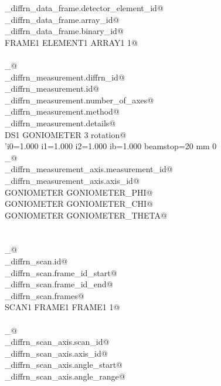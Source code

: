 \documentclass[10pt,a4paper,twoside,notitlepage]{article}
\begin{document}
\begin{flushleft}
\begin{minipage}{\linewidth}
\begin{list}{}{}
\mbox{}\verb@_diffrn_data_frame.detector_element_id@\\
\mbox{}\verb@_diffrn_data_frame.array_id@\\
\mbox{}\verb@_diffrn_data_frame.binary_id@\\
\mbox{}\verb@ FRAME1 ELEMENT1 ARRAY1 1@\\
\mbox{}\verb@@\\
\mbox{}\verb@loop_@\\
\mbox{}\verb@_diffrn_measurement.diffrn_id@\\
\mbox{}\verb@_diffrn_measurement.id@\\
\mbox{}\verb@_diffrn_measurement.number_of_axes@\\
\mbox{}\verb@_diffrn_measurement.method@\\
\mbox{}\verb@_diffrn_measurement.details@\\
\mbox{}\verb@ DS1 GONIOMETER 3 rotation@\\
\mbox{}\verb@ 'i0=1.000 i1=1.000 i2=1.000 ib=1.000 beamstop=20 mm 0% attenuation'@\\
\mbox{}\verb@@\\
\mbox{}\verb@loop_@\\
\mbox{}\verb@_diffrn_measurement_axis.measurement_id@\\
\mbox{}\verb@_diffrn_measurement_axis.axis_id@\\
\mbox{}\verb@ GONIOMETER GONIOMETER_PHI@\\
\mbox{}\verb@ GONIOMETER GONIOMETER_CHI@\\
\mbox{}\verb@ GONIOMETER GONIOMETER_THETA@\\
\mbox{}\verb@@\\
\mbox{}\verb@@\\
\mbox{}\verb@loop_@\\
\mbox{}\verb@_diffrn_scan.id@\\
\mbox{}\verb@_diffrn_scan.frame_id_start@\\
\mbox{}\verb@_diffrn_scan.frame_id_end@\\
\mbox{}\verb@_diffrn_scan.frames@\\
\mbox{}\verb@ SCAN1 FRAME1 FRAME1 1@\\
\mbox{}\verb@@\\
\mbox{}\verb@loop_@\\
\mbox{}\verb@_diffrn_scan_axis.scan_id@\\
\mbox{}\verb@_diffrn_scan_axis.axis_id@\\
\mbox{}\verb@_diffrn_scan_axis.angle_start@\\
\mbox{}\verb@_diffrn_scan_axis.angle_range@\\

\end{list}
\end{minipage}
\end{flushleft}
\end{document}
